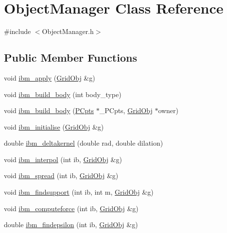 \hypertarget{class_object_manager}{}\section{Object\+Manager Class Reference}
\label{class_object_manager}


{\ttfamily \#include $<$Object\+Manager.\+h$>$}

\subsection*{Public Member Functions}
\begin{DoxyCompactItemize}
\item 
void \hyperlink{class_object_manager_a83174cbaabd95639f8b4f652ad398183}{ibm\+\_\+apply} (\hyperlink{class_grid_obj}{Grid\+Obj} \&g)
\item 
void \hyperlink{class_object_manager_af89336910b6f3157e5b17b4ea6d30a12}{ibm\+\_\+build\+\_\+body} (int body\+\_\+type)
\item 
void \hyperlink{class_object_manager_ac8270fe5b646e512a34748b5ca51671c}{ibm\+\_\+build\+\_\+body} (\hyperlink{class_p_cpts}{P\+Cpts} $\ast$\+\_\+\+P\+Cpts, \hyperlink{class_grid_obj}{Grid\+Obj} $\ast$owner)
\item 
void \hyperlink{class_object_manager_abc6dd6c73900724e7c0025d66e803c95}{ibm\+\_\+initialise} (\hyperlink{class_grid_obj}{Grid\+Obj} \&g)
\item 
double \hyperlink{class_object_manager_a4e55e3a84bae37a75f8487fd575169fb}{ibm\+\_\+deltakernel} (double rad, double dilation)
\item 
void \hyperlink{class_object_manager_a4df9f08d3a47519884afa17f1ecaa1da}{ibm\+\_\+interpol} (int ib, \hyperlink{class_grid_obj}{Grid\+Obj} \&g)
\item 
void \hyperlink{class_object_manager_a91d38ea7d0fbc6fd93e8c34559492b48}{ibm\+\_\+spread} (int ib, \hyperlink{class_grid_obj}{Grid\+Obj} \&g)
\item 
void \hyperlink{class_object_manager_a51772c72562eddaf91b1eabdf74eb4c9}{ibm\+\_\+findsupport} (int ib, int m, \hyperlink{class_grid_obj}{Grid\+Obj} \&g)
\item 
void \hyperlink{class_object_manager_ab1e4ac7c9e115b8e31e7a89ec32cbee0}{ibm\+\_\+computeforce} (int ib, \hyperlink{class_grid_obj}{Grid\+Obj} \&g)
\item 
double \hyperlink{class_object_manager_ab0ef3e60b3ea723d6989c6900107d5ef}{ibm\+\_\+findepsilon} (int ib, \hyperlink{class_grid_obj}{Grid\+Obj} \&g)

\end{DoxyCompactItemize}
